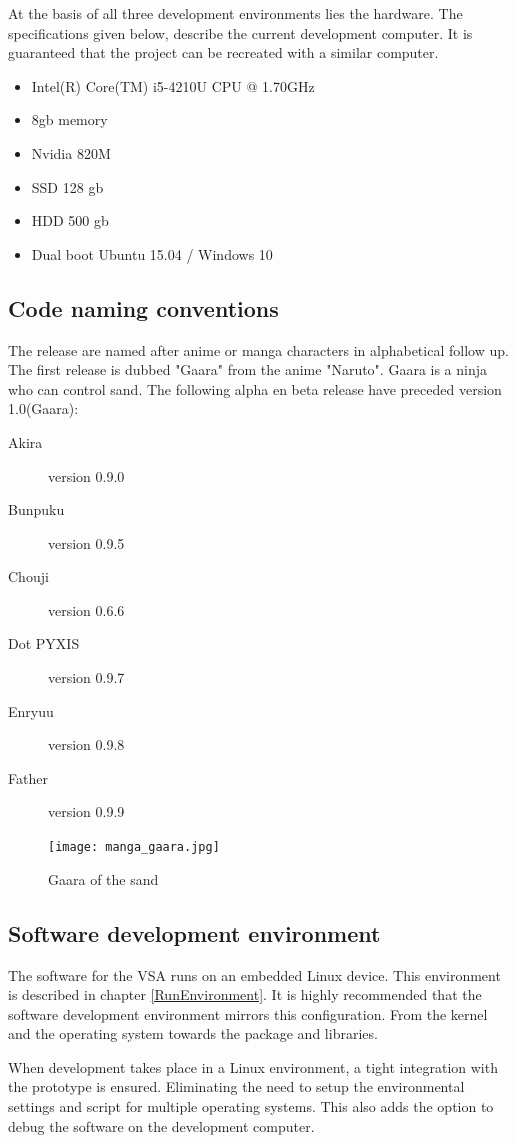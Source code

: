 \documentclass[11pt,fleqn,,a4paper,twoside,openright]{book}
\begin{document}
At the basis of all three development environments lies the hardware. The specifications given below, describe the current development computer. It is guaranteed that the project can be recreated with a similar computer.
\begin{itemize}
	\item Intel(R) Core(TM) i5-4210U CPU @ 1.70GHz
	\item 8gb memory
	\item Nvidia 820M
	\item SSD 128 gb
	\item HDD 500 gb
	\item Dual boot Ubuntu 15.04 / Windows 10
\end{itemize}

\subsection{Code naming conventions}
The release are named after anime or manga characters in alphabetical follow up. The first release is dubbed "Gaara" from the anime "Naruto". Gaara is a ninja who can control sand. The following alpha en beta release have preceded version 1.0(Gaara):
\begin{description}
	\item[Akira] version 0.9.0
	\item[Bunpuku] version 0.9.5
	\item[Chouji] version 0.6.6
	\item[Dot PYXIS] version 0.9.7
	\item[Enryuu] version 0.9.8
	\item[Father] version 0.9.9
\end{description}
\begin{figure}[h]
	\texttt{[image: manga\_gaara.jpg]}
	\caption{Gaara of the sand}\label{fig:mangaGaara}
\end{figure}

\subsection{Software development environment}
The software for the VSA runs on an embedded Linux device. This environment is described in chapter \ref{RunEnvironment}. It is highly recommended that the software development environment mirrors this configuration. From the kernel and the operating system towards the package and libraries.

When development takes place in a Linux environment, a tight integration with the prototype is ensured. Eliminating the need to setup the environmental settings and script for multiple operating systems. This also adds the option to debug the software on the development computer.
\end{document}
